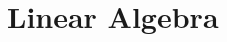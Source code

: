 \documentclass[12pt,oneside]{book}
\begin{document}
\pagestyle{empty}
\part{Linear Algebra}
\begin{multicols}{2}
  \tableofcontents
\end{multicols}


\end{document}

